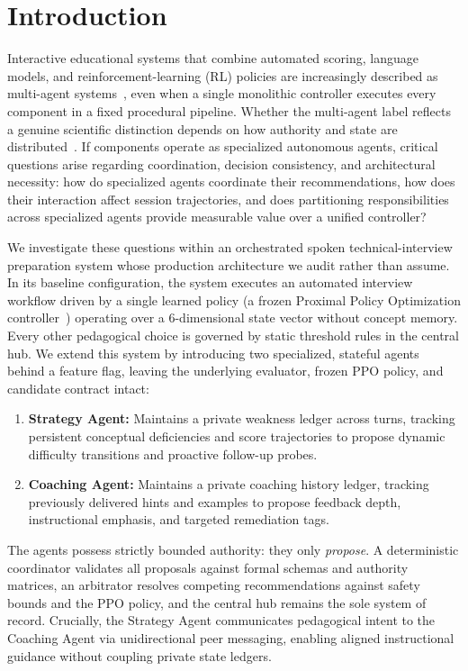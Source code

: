 \section{Introduction}\label{sec:intro}
Interactive educational systems that combine automated scoring, language models, and reinforcement-learning (RL) policies are increasingly described as multi-agent systems~\cite{autogen,metagpt}, even when a single monolithic controller executes every component in a fixed procedural pipeline. Whether the multi-agent label reflects a genuine scientific distinction depends on how authority and state are distributed~\cite{wj95}. If components operate as specialized autonomous agents, critical questions arise regarding coordination, decision consistency, and architectural necessity: how do specialized agents coordinate their recommendations, how does their interaction affect session trajectories, and does partitioning responsibilities across specialized agents provide measurable value over a unified controller?

We investigate these questions within an orchestrated spoken technical-interview preparation system whose production architecture we audit rather than assume. In its baseline configuration, the system executes an automated interview workflow driven by a single learned policy (a frozen Proximal Policy Optimization controller~\cite{ppo,sb3}) operating over a 6-dimensional state vector without concept memory. Every other pedagogical choice is governed by static threshold rules in the central hub. We extend this system by introducing two specialized, stateful agents behind a feature flag, leaving the underlying evaluator, frozen PPO policy, and candidate contract intact:
\begin{enumerate}
\item \textbf{Strategy Agent:} Maintains a private weakness ledger across turns, tracking persistent conceptual deficiencies and score trajectories to propose dynamic difficulty transitions and proactive follow-up probes.
\item \textbf{Coaching Agent:} Maintains a private coaching history ledger, tracking previously delivered hints and examples to propose feedback depth, instructional emphasis, and targeted remediation tags.
\end{enumerate}
The agents possess strictly bounded authority: they only \emph{propose}. A deterministic coordinator validates all proposals against formal schemas and authority matrices, an arbitrator resolves competing recommendations against safety bounds and the PPO policy, and the central hub remains the sole system of record. Crucially, the Strategy Agent communicates pedagogical intent to the Coaching Agent via unidirectional peer messaging, enabling aligned instructional guidance without coupling private state ledgers.

